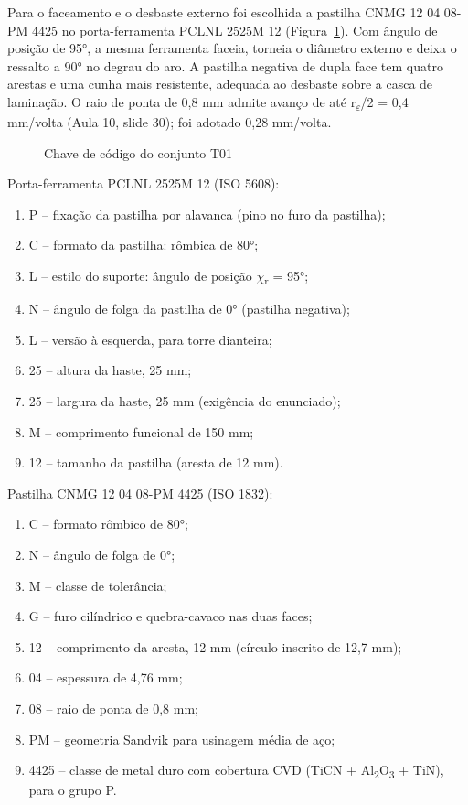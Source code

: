 Para o faceamento e o desbaste externo foi escolhida a pastilha CNMG 12 04 08-PM 4425 no porta-ferramenta PCLNL 2525M 12 (Figura~\ref{fig:chaveT01}). Com ângulo de posição de 95°, a mesma ferramenta faceia, torneia o diâmetro externo e deixa o ressalto a 90° no degrau do aro. A pastilha negativa de dupla face tem quatro arestas e uma cunha mais resistente, adequada ao desbaste sobre a casca de laminação. O raio de ponta de 0,8 mm admite avanço de até r\textsubscript{$\varepsilon$}/2 = 0,4 mm/volta (Aula 10, slide 30); foi adotado 0,28 mm/volta.

\begin{figure}[H]
\centering
\caption{Chave de código do conjunto T01}\label{fig:chaveT01}
\par\medskip
{}
\end{figure}

\noindent Porta-ferramenta PCLNL 2525M 12 (ISO 5608):
\begin{enumerate}[label=\arabic*:, leftmargin=1.6cm]
\item P – fixação da pastilha por alavanca (pino no furo da pastilha);
\item C – formato da pastilha: rômbica de 80°;
\item L – estilo do suporte: ângulo de posição $\chi$\textsubscript{r} = 95°;
\item N – ângulo de folga da pastilha de 0° (pastilha negativa);
\item L – versão à esquerda, para torre dianteira;
\item 25 – altura da haste, 25 mm;
\item 25 – largura da haste, 25 mm (exigência do enunciado);
\item M – comprimento funcional de 150 mm;
\item 12 – tamanho da pastilha (aresta de 12 mm).
\end{enumerate}

\noindent Pastilha CNMG 12 04 08-PM 4425 (ISO 1832):
\begin{enumerate}[label=\arabic*:, leftmargin=1.6cm]
\item C – formato rômbico de 80°;
\item N – ângulo de folga de 0°;
\item M – classe de tolerância;
\item G – furo cilíndrico e quebra-cavaco nas duas faces;
\item 12 – comprimento da aresta, 12 mm (círculo inscrito de 12,7 mm);
\item 04 – espessura de 4,76 mm;
\item 08 – raio de ponta de 0,8 mm;
\item PM – geometria Sandvik para usinagem média de aço;
\item 4425 – classe de metal duro com cobertura CVD (TiCN + Al\textsubscript{2}O\textsubscript{3} + TiN), para o grupo P.
\end{enumerate}

